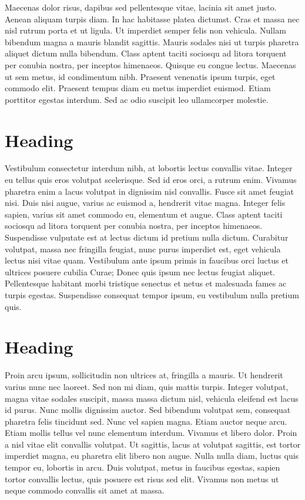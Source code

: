 \documentclass[10pt,a4paper]{article}
\begin{document}
\begin{multicols}{2}
Maecenas dolor risus, dapibus sed pellentesque vitae, lacinia sit amet justo. Aenean aliquam turpis diam. In hac habitasse platea dictumst. Cras et massa nec nisl rutrum porta et ut ligula. Ut imperdiet semper felis non vehicula. Nullam bibendum magna a mauris blandit sagittis. Mauris sodales nisi ut turpis pharetra aliquet dictum nulla bibendum. Class aptent taciti sociosqu ad litora torquent per conubia nostra, per inceptos himenaeos. Quisque eu congue lectus. Maecenas ut sem metus, id condimentum nibh. Praesent venenatis ipsum turpis, eget commodo elit. Praesent tempus diam eu metus imperdiet euismod. Etiam porttitor egestas interdum. Sed ac odio suscipit leo ullamcorper molestie.

\section{Heading}
Vestibulum consectetur interdum nibh, at lobortis lectus convallis vitae. Integer eu tellus quis eros volutpat scelerisque. Sed id eros orci, a rutrum enim. Vivamus pharetra enim a lacus volutpat in dignissim nisl convallis. Fusce sit amet feugiat nisi. Duis nisi augue, varius ac euismod a, hendrerit vitae magna. Integer felis sapien, varius sit amet commodo eu, elementum et augue. Class aptent taciti sociosqu ad litora torquent per conubia nostra, per inceptos himenaeos. Suspendisse vulputate est at lectus dictum id pretium nulla dictum. Curabitur volutpat, massa nec fringilla feugiat, nunc purus imperdiet est, eget vehicula lectus nisi vitae quam. Vestibulum ante ipsum primis in faucibus orci luctus et ultrices posuere cubilia Curae; Donec quis ipsum nec lectus feugiat aliquet. Pellentesque habitant morbi tristique senectus et netus et malesuada fames ac turpis egestas. Suspendisse consequat tempor ipsum, eu vestibulum nulla pretium quis.

\section{Heading}
Proin arcu ipsum, sollicitudin non ultrices at, fringilla a mauris. Ut hendrerit varius nunc nec laoreet. Sed non mi diam, quis mattis turpis. Integer volutpat, magna vitae sodales suscipit, massa massa dictum nisl, vehicula eleifend est lacus id purus. Nunc mollis dignissim auctor. Sed bibendum volutpat sem, consequat pharetra felis tincidunt sed. Nunc vel sapien magna. Etiam auctor neque arcu. Etiam mollis tellus vel nunc elementum interdum. Vivamus et libero dolor. Proin a nisl vitae elit convallis volutpat. Ut sagittis, lacus at volutpat sagittis, est tortor imperdiet magna, eu pharetra elit libero non augue. Nulla nulla diam, luctus quis tempor eu, lobortis in arcu. Duis volutpat, metus in faucibus egestas, sapien tortor convallis lectus, quis posuere est risus sed elit. Vivamus non metus ut neque commodo convallis sit amet at massa.


\end{multicols}
\end{document}
